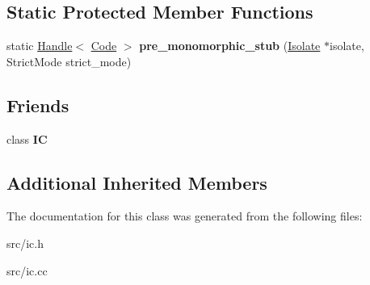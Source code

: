 \subsection*{Static Protected Member Functions}
\begin{DoxyCompactItemize}
\item 
\hypertarget{classv8_1_1internal_1_1_keyed_store_i_c_a2dcae49c2bc128a0c4623a18f7930372}{}static \hyperlink{classv8_1_1internal_1_1_handle}{Handle}$<$ \hyperlink{classv8_1_1internal_1_1_code}{Code} $>$ {\bfseries pre\+\_\+monomorphic\+\_\+stub} (\hyperlink{classv8_1_1internal_1_1_isolate}{Isolate} $\ast$isolate, Strict\+Mode strict\+\_\+mode)\label{classv8_1_1internal_1_1_keyed_store_i_c_a2dcae49c2bc128a0c4623a18f7930372}

\end{DoxyCompactItemize}
\subsection*{Friends}
\begin{DoxyCompactItemize}
\item 
\hypertarget{classv8_1_1internal_1_1_keyed_store_i_c_ae59e849648858af1fd22081890d47b78}{}class {\bfseries I\+C}\label{classv8_1_1internal_1_1_keyed_store_i_c_ae59e849648858af1fd22081890d47b78}

\end{DoxyCompactItemize}
\subsection*{Additional Inherited Members}


The documentation for this class was generated from the following files\+:\begin{DoxyCompactItemize}
\item 
src/ic.\+h\item 
src/ic.\+cc\end{DoxyCompactItemize}
